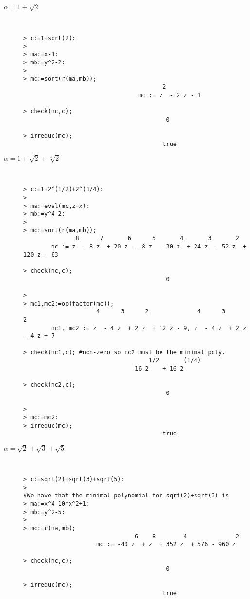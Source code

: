 \documentclass[10pt]{report}
\newcommand{\blank}{\textcolor{white}{-}}
\begin{document}
\begin{description}
\item[\underline{$\alpha = 1 + \sqrt{2}$}] \blank 
\begin{verbatim}
> c:=1+sqrt(2):
> 
> ma:=x-1:
> mb:=y^2-2:
> 
> mc:=sort(r(ma,mb));
                                        2
                                 mc := z  - 2 z - 1

> check(mc,c);
                                         0

> irreduc(mc);
                                        true
\end{verbatim}


\item[\underline{$\alpha = 1 + \sqrt{2} + \sqrt[4]{2}$}] \blank
\begin{verbatim}
> c:=1+2^(1/2)+2^(1/4):
> 
> ma:=eval(mc,z=x):
> mb:=y^4-2:
> 
> mc:=sort(r(ma,mb));
               8      7       6      5       4       3       2
        mc := z  - 8 z  + 20 z  - 8 z  - 30 z  + 24 z  - 52 z  + 120 z - 63

> check(mc,c);
                                         0

> 
> mc1,mc2:=op(factor(mc));
                     4      3      2              4      3      2
        mc1, mc2 := z  - 4 z  + 2 z  + 12 z - 9, z  - 4 z  + 2 z  - 4 z + 7

> check(mc1,c); #non-zero so mc2 must be the minimal poly.
                                    1/2       (1/4)
                                16 2    + 16 2

> check(mc2,c);
                                         0

> 
> mc:=mc2:
> irreduc(mc);
                                        true
\end{verbatim}

\item[\underline{$\alpha = \sqrt 2 + \sqrt 3 + \sqrt 5$}] \blank
\begin{verbatim}
> c:=sqrt(2)+sqrt(3)+sqrt(5):
> 
#We have that the minimal polynomial for sqrt(2)+sqrt(3) is
> ma:=x^4-10*x^2+1:
> mb:=y^2-5:
> 
> mc:=r(ma,mb);
                                6    8        4              2
                     mc := -40 z  + z  + 352 z  + 576 - 960 z

> check(mc,c);
                                         0

> irreduc(mc);
                                        true
\end{verbatim}
\end{description}
\end{document}

